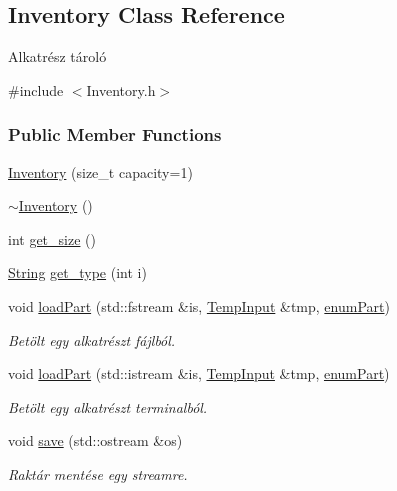 \hypertarget{class_inventory}{}\subsection{Inventory Class Reference}
\label{class_inventory}


Alkatrész tároló  




{\ttfamily \#include $<$Inventory.\+h$>$}

\subsubsection*{Public Member Functions}
\begin{DoxyCompactItemize}
\item 
\mbox{\hyperlink{class_inventory_af2c8bea3c8fbf97fec4d3f5ffb92f347}{Inventory}} (size\+\_\+t capacity=1)
\item 
\mbox{\hyperlink{class_inventory_a6c6dfcb6d977c74a7abf46809e892e3d}{$\sim$\+Inventory}} ()
\item 
int \mbox{\hyperlink{class_inventory_a3ccacc9422b01b2c17836ca804bcaafc}{get\+\_\+size}} ()
\item 
\mbox{\hyperlink{class_string}{String}} \mbox{\hyperlink{class_inventory_a217895dbb60e3d7643c41fdeeb775bc9}{get\+\_\+type}} (int i)
\item 
void \mbox{\hyperlink{class_inventory_a78912f140decdd10037eb682cf295d72}{load\+Part}} (std\+::fstream \&is, \mbox{\hyperlink{struct_temp_input}{Temp\+Input}} \&tmp, \mbox{\hyperlink{_parts_8h_abddff37837f171d72a2e16a1448a3943}{enum\+Part}})
\begin{DoxyCompactList}\small\item\em Betölt egy alkatrészt fájlból. \end{DoxyCompactList}\item 
void \mbox{\hyperlink{class_inventory_a9dd64f268a7a5cca611b5f749ec33f96}{load\+Part}} (std\+::istream \&is, \mbox{\hyperlink{struct_temp_input}{Temp\+Input}} \&tmp, \mbox{\hyperlink{_parts_8h_abddff37837f171d72a2e16a1448a3943}{enum\+Part}})
\begin{DoxyCompactList}\small\item\em Betölt egy alkatrészt terminalból. \end{DoxyCompactList}\item 
void \mbox{\hyperlink{class_inventory_a243a3e96705999b3cf556e9626a96525}{save}} (std\+::ostream \&os)
\begin{DoxyCompactList}\small\item\em Raktár mentése egy streamre. \end{DoxyCompactList}\item 

\end{DoxyCompactItemize}
